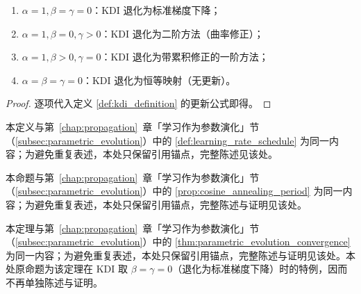 \begin{property}\label{prop:kdi_degenerations}
\begin{enumerate}[label=(\roman*)]
    \item $\alpha=1,\beta=\gamma=0$：KDI 退化为标准梯度下降；
    \item $\alpha=1,\beta=0,\gamma>0$：KDI 退化为二阶方法（曲率修正）；
    \item $\alpha=1,\beta>0,\gamma=0$：KDI 退化为带累积修正的一阶方法；
    \item $\alpha=\beta=\gamma=0$：KDI 退化为恒等映射（无更新）。
\end{enumerate}
\end{property}

\begin{proof}
逐项代入定义 \ref{def:kdi_definition} 的更新公式即得。
\end{proof}

\begin{definition}[学习率调度]\label{def:learning_rate_schedule_ps}
本定义与第~\ref{chap:propagation}~章「学习作为参数演化」节（\cref{subsec:parametric_evolution}）中的 \cref{def:learning_rate_schedule} 为同一内容；为避免重复表述，本处只保留引用锚点，完整陈述见该处。
\end{definition}

\begin{proposition}[余弦退火学习率的周期结构]\label{prop:cosine_annealing_period_ps}
本命题与第~\ref{chap:propagation}~章「学习作为参数演化」节（\cref{subsec:parametric_evolution}）中的 \cref{prop:cosine_annealing_period} 为同一内容；为避免重复表述，本处只保留引用锚点，完整陈述与证明见该处。
\end{proposition}

\begin{theorem}[二次损失下的收敛条件]\label{thm:ps_kdi_convergence}
本定理与第~\ref{chap:propagation}~章「学习作为参数演化」节（\cref{subsec:parametric_evolution}）中的 \cref{thm:parametric_evolution_convergence} 为同一内容；为避免重复表述，本处只保留引用锚点，完整陈述与证明见该处。本处原命题为该定理在 KDI 取 $\beta=\gamma=0$（退化为标准梯度下降）时的特例，因而不再单独陈述与证明。
\end{theorem}

